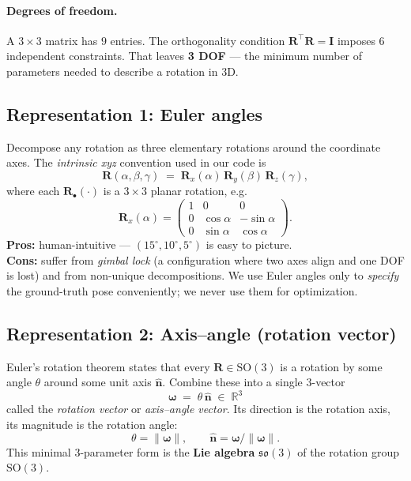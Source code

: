 \documentclass[11pt]{article}
\newcommand{\R}{\mathbb{R}}
\newcommand{\SO}[1]{\mathrm{SO}(#1)}
\newcommand{\so}[1]{\mathfrak{so}(#1)}
\newcommand{\norm}[1]{\left\lVert #1 \right\rVert}
\begin{document}
\paragraph{Degrees of freedom.}
A $3\times 3$ matrix has $9$ entries. The orthogonality condition
$\mathbf{R}^\top \mathbf{R} = \mathbf{I}$ imposes $6$ independent constraints. That
leaves \textbf{3 DOF} --- the minimum number of parameters needed to
describe a rotation in 3D.

\subsection{Representation 1: Euler angles}

Decompose any rotation as three elementary rotations around the coordinate
axes. The \emph{intrinsic xyz} convention used in our code is
\begin{equation}
  \mathbf{R}(\alpha,\beta,\gamma) \;=\; \mathbf{R}_x(\alpha)\,\mathbf{R}_y(\beta)\,\mathbf{R}_z(\gamma),
\end{equation}
where each $\mathbf{R}_\bullet(\cdot)$ is a $3\times 3$ planar rotation, e.g.
\begin{equation}
  \mathbf{R}_x(\alpha) =
  \begin{pmatrix} 1 & 0 & 0 \\ 0 & \cos\alpha & -\sin\alpha \\ 0 & \sin\alpha & \cos\alpha \end{pmatrix}.
\end{equation}
\textbf{Pros:} human-intuitive --- $(15^\circ, 10^\circ, 5^\circ)$ is easy to picture.\\
\textbf{Cons:} suffer from \emph{gimbal lock} (a configuration where two
axes align and one DOF is lost) and from non-unique decompositions. We use
Euler angles only to \emph{specify} the ground-truth pose conveniently; we
never use them for optimization.

\subsection{Representation 2: Axis--angle (rotation vector)}

Euler's rotation theorem states that every $\mathbf{R} \in \SO{3}$ is a
rotation by some angle $\theta$ around some unit axis $\hat{\mathbf{n}}$. Combine
these into a single 3-vector
\begin{equation}
  \boxed{\quad
    \boldsymbol{\omega} \;=\; \theta\,\hat{\mathbf{n}} \;\in\; \R^3
  \quad}
  \label{eq:axis-angle}
\end{equation}
called the \emph{rotation vector} or \emph{axis--angle vector}. Its
direction is the rotation axis, its magnitude is the rotation angle:
\begin{equation}
  \theta = \norm{\boldsymbol{\omega}}, \qquad
  \hat{\mathbf{n}} = \boldsymbol{\omega}/\norm{\boldsymbol{\omega}}.
\end{equation}
This minimal 3-parameter form is the \textbf{Lie algebra} $\so{3}$ of the
rotation group $\SO{3}$.
\end{document}
